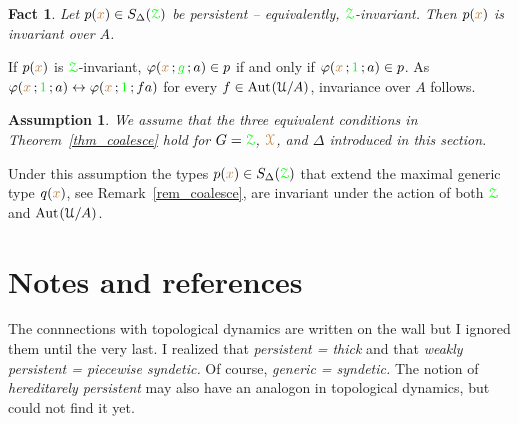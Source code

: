 \documentclass[10pt,openany]{amsproc}
\makeatletter
\newcommand{\mylabel}[1]{{\ssf{#1}}\hfill}
\renewenvironment{itemize}
  {\begin{list}{}{%
   \setlength{\parskip}{0mm}
   \setlength{\topsep}{.2\baselineskip}
   \setlength{\rightmargin}{0mm}
   \setlength{\listparindent}{0mm}
   \setlength{\itemindent}{0mm}
   \setlength{\labelwidth}{2ex}
   \setlength{\itemsep}{.1\baselineskip}
   \setlength{\parsep}{0mm}
   \setlength{\partopsep}{0mm}
   \setlength{\labelsep}{1ex}
   \setlength{\leftmargin}{\labelwidth+\labelsep}
   \let\makelabel\mylabel
   }}
   {\vspace*{-.3\baselineskip}\end{list}}
\def\Aut{{\rm Aut\kern.15ex}}
\def\iff{\leftrightarrow}
\def\D{\EuScript D}
\def\X{\EuScript X}
\def\Z{\EuScript Z}
\def\U{\EuScript U}
\def\G{\EuScript G}
\def\phi{\varphi}
\def\ssf#1{\textsf{\small #1}}
\newcounter{thm}
\theoremstyle{mio}
\newtheorem{fact}[thm]{Fact}\tcolorboxenvironment{fact}{mythm}
\newtheorem{assumption}[thm]{Assumption}\tcolorboxenvironment{assumption}{mythm}
\providecommand{\proofNameStyle}{\bfseries}
\renewenvironment{proof}[1][\proofname]{\par
  \pushQED{\qed}%
  \normalfont%
  \trivlist
  \item[\hskip\labelsep
        \proofNameStyle
    #1\@addpunct{.}]\ignorespaces
}{%
  \popQED\endtrivlist\@endpefalse
}
\def\mr{\color{brown}}
\def\gr{\color{green}}
\def\mrD{{\mr\D}}
\def\mrG{{\mr\G}}
\def\mrX{{\mr\X}}
\def\grG{{\gr\G}}
\def\grZ{{\gr\Z}}
\makeatother
\begin{document}
\begin{fact}
  Let $p({\mr x})\in S_\Delta(\grZ)$ be persistent -- equivalently, $\grZ$-invariant. Then $p({\mr x})$ is invariant over $A$.
\end{fact}

\begin{proof}
  If $p({\mr x})$ is $\grZ$-invariant, $\phi({\mr x}\,;{\gr g}\,;a)\in p$ if and only if  $\phi({\mr x}\,;{\gr 1}\,;a)\in p$.
  As $\phi({\mr x}\,;{\gr 1}\,;a)\iff\phi({\mr x}\,;{\gr 1}\,;fa)$ for every $f\in\Aut(\U/A)$, invariance over $A$ follows.
\end{proof}






\begin{assumption}
  We assume that the three equivalent conditions in Theorem~\ref{thm_coalesce} hold for $G=\grZ$, $\mrX$, and $\Delta$ introduced in this section.
\end{assumption}

Under this assumption the types $p({\mr x})\in S_\Delta(\grZ)$ that extend the maximal generic type $q({\mr x})$, see Remark~\ref{rem_coalesce}, are invariant under the action of both $\grZ$ and $\Aut(\U/A)$.

\section{Notes and references}

The connnections with topological dynamics are written on the wall but I ignored them until the very last.
I realized that \textit{persistent = thick\/} and that \textit{weakly persistent = piecewise syndetic.} 
Of course, \textit{generic = syndetic.}
The notion of \textit{hereditarely persistent\/} may also have an analogon in topological dynamics, but could not find it yet.
\end{document}
